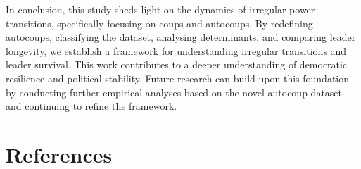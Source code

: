 \documentclass[
  12pt,
]{report}
\begin{document}
In conclusion, this study sheds light on the dynamics of irregular power
transitions, specifically focusing on coups and autocoups. By redefining
autocoups, classifying the dataset, analysing determinants, and
comparing leader longevity, we establish a framework for understanding
irregular transitions and leader survival. This work contributes to a
deeper understanding of democratic resilience and political stability.
Future research can build upon this foundation by conducting further
empirical analyses based on the novel autocoup dataset and continuing to
refine the framework.

\newpage

\chapter*{References}\label{references}
\end{document}
